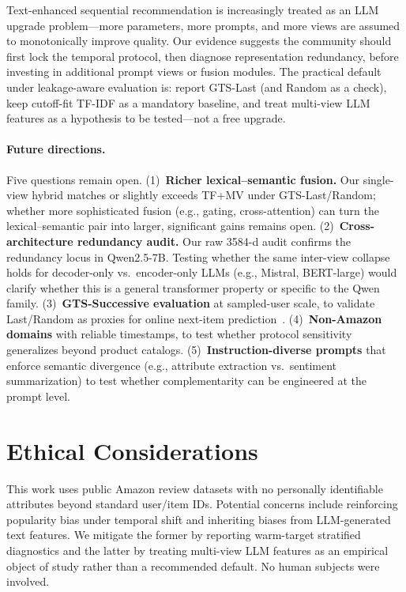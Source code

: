 \documentclass[sigconf,natbib=true,anonymous]{acmart}
\newcommand{\tfidf}{\textsc{TF-IDF}\xspace}
\newcommand{\tfmv}{\textsc{TF+MV}\xspace}
\begin{document}
Text-enhanced sequential recommendation is increasingly treated as an LLM upgrade problem---more parameters, more prompts, and more views are assumed to monotonically improve quality.
Our evidence suggests the community should first lock the temporal protocol, then diagnose representation redundancy, before investing in additional prompt views or fusion modules.
The practical default under leakage-aware evaluation is: report GTS-Last (and Random as a check), keep cutoff-fit \tfidf as a mandatory baseline, and treat multi-view LLM features as a hypothesis to be tested---not a free upgrade.

\paragraph{Future directions.}
Five questions remain open.
(1)~\textbf{Richer lexical--semantic fusion.}  Our single-view hybrid matches or slightly exceeds \tfmv under GTS-Last/Random; whether more sophisticated fusion (e.g., gating, cross-attention) can turn the lexical--semantic pair into larger, significant gains remains open.
(2)~\textbf{Cross-architecture redundancy audit.}  Our raw 3584-d audit confirms the redundancy locus in Qwen2.5-7B.  Testing whether the same inter-view collapse holds for decoder-only vs.\ encoder-only LLMs (e.g., Mistral, BERT-\hspace{0pt}large) would clarify whether this is a general transformer property or specific to the Qwen family.
(3)~\textbf{GTS-Successive evaluation} at sampled-user scale, to validate Last/Random as proxies for online next-item prediction~\cite{gusak2025time}.
(4)~\textbf{Non-Amazon domains} with reliable timestamps, to test whether protocol sensitivity generalizes beyond product catalogs.
(5)~\textbf{Instruction-diverse prompts} that enforce semantic divergence (e.g., attribute extraction vs.\ sentiment summarization) to test whether complementarity can be engineered at the prompt level.

\section*{Ethical Considerations}
This work uses public Amazon review datasets with no personally identifiable attributes beyond standard user/item IDs.
Potential concerns include reinforcing popularity bias under temporal shift and inheriting biases from LLM-generated text features.
We mitigate the former by reporting warm-target stratified diagnostics and the latter by treating multi-view LLM features as an empirical object of study rather than a recommended default.
No human subjects were involved.
\end{document}
